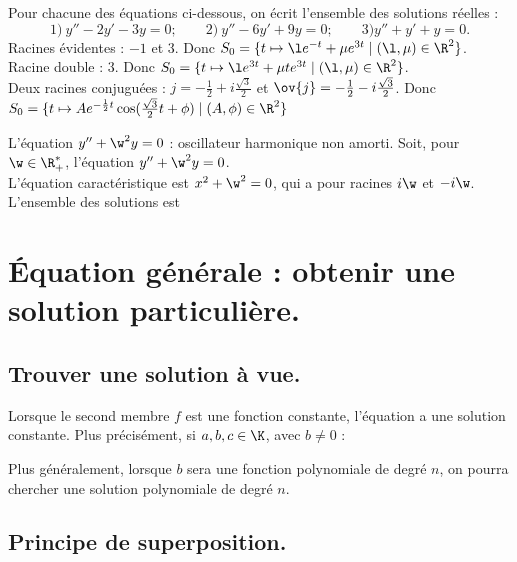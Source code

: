 \documentclass[11pt]{article}
\begin{document}
\begin{ex}{}{}
    Pour chacune des équations ci-dessous, on écrit l'ensemble des solutions réelles :
    \begin{equation*}
        1)~y''-2y'-3y=0; \qquad 2)~y''-6y'+9y=0; \qquad 3)y''+y'+y=0.
    \end{equation*}
    \tcblower
     Racines évidentes : $-1$ et $3$. Donc $S_0=\{t\mapsto \l e^{-t}+\mu e^{3t} \mid (\l, \mu)\in\R^2\}$.\\
     Racine double : $3$. Donc $S_0=\{t\mapsto \l e^{3t} + \mu te^{3t} \mid (\l,\mu)\in\R^2\}$.\\
     Deux racines conjuguées : $j=-\frac{1}{2}+i\frac{\sqrt{3}}{2}$ et $\ov{j}=-\frac{1}{2}-i\frac{\sqrt{3}}{2}$. Donc $S_0=\{t\mapsto Ae^{-\frac{1}{2}t}\cos(\frac{\sqrt{3}}{2}t+\phi)\mid(A,\phi)\in\R^2\}$
\end{ex}

\begin{ex2}{L'équation $y''+\w^2y=0$ : oscillateur harmonique non amorti.}{}
  Soit, pour $\w\in\R^*_+$, l'équation $y''+\w^2y=0$.\\
  L'équation caractéristique est $x^2+\w^2=0$, qui a pour racines $i\w$ et $-i\w$.\n
  L'ensemble des solutions est \quad{}
\end{ex2}

\section{Équation générale : obtenir une solution particulière.}

\subsection{Trouver une solution à vue.}
\quad Lorsque le second membre $f$ est une fonction constante, l'équation a une solution constante. Plus précisément, si $a,b,c\in\K$, avec $b\neq0$ :
\begin{center}
\end{center} 
\quad Plus généralement, lorsque $b$ sera une fonction polynomiale de degré $n$, on pourra chercher une solution polynomiale de degré $n$.
\subsection{Principe de superposition.}
\end{document}
